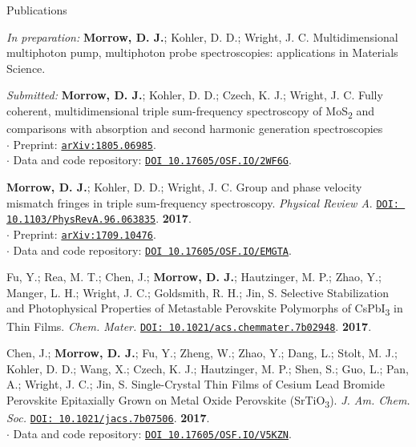 \documentclass{resume} %
\begin{document}
\pagebreak

\begin{rSection}{Publications}
	
\begin{etaremune}
	
\item \textit{In preparation:} \textbf{Morrow, D. J.}; Kohler, D. D.; Wright, J. C. Multidimensional multiphoton pump, multiphoton probe spectroscopies: applications in Materials Science.
	
\item \textit{Submitted:} \textbf{Morrow, D. J.}; Kohler, D. D.; Czech, K. J.; Wright, J. C. 
Fully coherent, multidimensional triple sum-frequency spectroscopy of MoS\textsubscript{2} and comparisons with absorption and second harmonic generation spectroscopies \\
$\cdot$ Preprint: \href{http://arxiv.org/abs/1805.06985}{\texttt{arXiv:1805.06985}}. \\
$\cdot$ Data and code repository: \href{https://osf.io/2wf6g/}{\texttt{DOI 10.17605/OSF.IO/2WF6G}}.
	
\item \textbf{Morrow, D. J.}; Kohler, D. D.; Wright, J. C. Group and phase velocity mismatch fringes in triple sum-frequency spectroscopy. \emph{Physical Review A}. \href{https://journals.aps.org/pra/abstract/10.1103/PhysRevA.96.063835}{\texttt{DOI: 10.1103/PhysRevA.96.063835}}. \textbf{2017}.\\
$\cdot$ Preprint: \href{http://arxiv.org/abs/1709.10476}{\texttt{arXiv:1709.10476}}. \\
$\cdot$ Data and code repository: \href{https://osf.io/emgta/}{\texttt{DOI 10.17605/OSF.IO/EMGTA}}.

\item Fu, Y.; Rea, M. T.; Chen, J.; \textbf{Morrow, D. J.}; Hautzinger, M. P.; Zhao, Y.; Manger, L. H.; Wright, J. C.; Goldsmith, R. H.; Jin, S. Selective Stabilization and Photophysical Properties of
Metastable Perovskite Polymorphs of CsPbI\textsubscript{3} in Thin Films. \emph{Chem. Mater.} \href{http://pubs.acs.org/doi/10.1021/acs.chemmater.7b02948}{\texttt{DOI: 10.1021/acs.chemmater.7b02948}}. \textbf{2017}. 
 
\item Chen, J.; \textbf{Morrow, D. J.}; Fu, Y.; Zheng, W.; Zhao, Y.; Dang, L.; Stolt, M. J.; Kohler, D. D.; Wang, X.; Czech, K. J.; Hautzinger, M. P.; Shen, S.; Guo, L.; Pan, A.; Wright, J. C.; Jin, S. Single-Crystal Thin Films of Cesium Lead Bromide Perovskite Epitaxially Grown on Metal Oxide Perovskite (SrTiO\textsubscript{3}). \emph{J. Am. Chem. Soc.} \href{http://pubs.acs.org/doi/10.1021/jacs.7b07506}{\texttt{DOI: 10.1021/jacs.7b07506}}. \textbf{2017}. \\
$\cdot$ Data and code repository: \href{https://osf.io/v5kzn/}{\texttt{DOI 10.17605/OSF.IO/V5KZN}}.
	



\end{etaremune}

\end{rSection}
\end{document}
